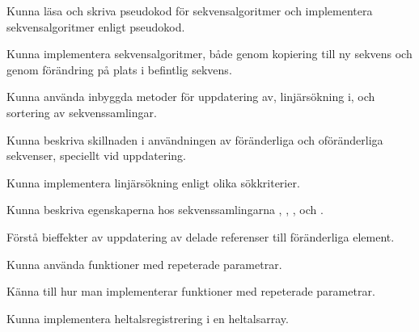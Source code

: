 
\item Kunna läsa och skriva pseudokod för sekvensalgoritmer och implementera sekvensalgoritmer enligt pseudokod.

\item Kunna implementera sekvensalgoritmer, både genom kopiering till ny sekvens och genom förändring på plats i befintlig sekvens.

\item Kunna använda inbyggda metoder för uppdatering av, linjärsökning i, och sortering av sekvenssamlingar.

\item Kunna beskriva skillnaden i användningen av föränderliga och oföränderliga sekvenser, speciellt vid uppdatering.

\item Kunna implementera linjärsökning enligt olika sökkriterier.

\item Kunna beskriva egenskaperna hos sekvenssamlingarna , , ,  och .

\item Förstå bieffekter av uppdatering av delade referenser till föränderliga element.

\item Kunna använda funktioner med repeterade parametrar.

\item Känna till hur man implementerar funktioner med repeterade parametrar.

\item Kunna implementera heltalsregistrering i en heltalsarray.




